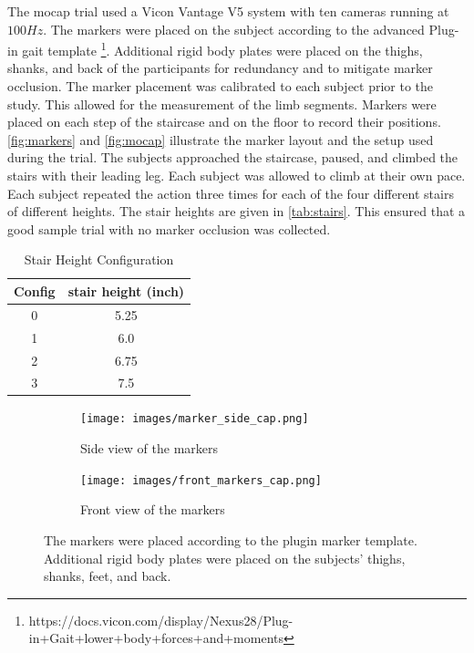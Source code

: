 The mocap trial used a Vicon Vantage V5 system with ten cameras running at $100Hz$. The markers were placed on the subject according to the advanced Plug-in gait template \footnote{https://docs.vicon.com/display/Nexus28/Plug-in+Gait+lower+body+forces+and+moments}. Additional rigid body plates were placed on the thighs, shanks, and back of the participants for redundancy and to mitigate marker occlusion. The marker placement was calibrated to each subject prior to the study. This allowed for the measurement of the limb segments. Markers were placed on each step of the staircase and on the floor to record their positions. \autoref{fig:markers} and \autoref{fig:mocap} illustrate the marker layout and the setup used during the trial. The subjects approached the staircase, paused, and climbed the stairs with their leading leg. Each subject was allowed to climb at their own pace. Each subject repeated the action three times for each of the four different stairs of different heights. The stair heights are given in \autoref{tab:stairs}. This ensured that a good sample trial with no marker occlusion was collected.   
\begin{table}[h!]
\centering
 \begin{tabular}{||c c ||} 
 \hline
 Config & stair height (inch) \\ [0.5ex] 
 \hline\hline
 0 & 5.25  \\ 
 \hline
 1 & 6.0  \\
 \hline
 2 & 6.75  \\
 \hline
 3 & 7.5 \\
 \hline
\end{tabular}
\caption{Stair Height Configuration}
\label{tab:stairs}
\end{table}


\begin{figure}
\centering 
\begin{subfigure}{0.5\linewidth} 
  \centering 
  \texttt{[image: images/marker\_side\_cap.png]} 
  \caption{Side view of the markers} 
  \label{fig:markers_side} 
\end{subfigure} 

\begin{subfigure}{0.5\linewidth} 
  \centering 
  \texttt{[image: images/front\_markers\_cap.png]} 
  \caption{Front view of the markers} 
  \label{fig:markers_front} 
\end{subfigure} 
\caption{The markers were placed according to the plugin marker template. Additional rigid body plates were placed on the subjects' thighs, shanks, feet, and back.} 
\label{fig:markers} 
\vspace*{-3mm}
\end{figure} 


